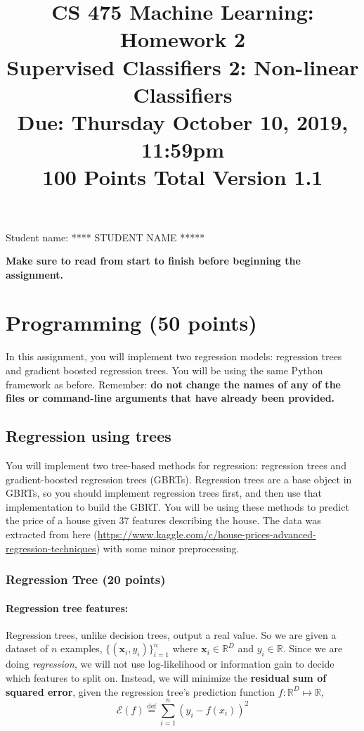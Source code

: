 \documentclass[11pt]{article}
\title{CS 475 Machine Learning: Homework 2\\
Supervised Classifiers 2: Non-linear Classifiers\\
\Large{Due: Thursday October 10, 2019, 11:59pm}\\
100 Points Total \hspace{1cm} Version 1.1}
\author{}
\date{}
\newcommand{\defeq}{\overset{\text{def}}{=}}
\begin{document}
\large
\maketitle
\thispagestyle{headings}

\vspace{-.5in}


\begin{answertext}{2cm}{}\centering
  Student name:  **** STUDENT NAME *****\\

\end{answertext}

{\bf Make sure to read from start to finish before beginning the assignment.}
\section{Programming (50 points)}
In this assignment, you will implement two regression models: regression trees and gradient boosted regression trees.
You will be using the same Python framework as before. Remember: \textbf{do not change the names of any of the files or command-line arguments that have already been provided.}

\subsection{Regression using trees}
You will implement two tree-based methods for regression: regression trees and gradient-boosted regression trees (GBRTs). Regression trees are a base object in GBRTs, so you should implement regression trees first, and then use that implementation to build the GBRT. You will be using these methods to predict the price of a house given 37 features describing the house. The data was extracted from here (\url{https://www.kaggle.com/c/house-prices-advanced-regression-techniques}) with some minor preprocessing.


\subsubsection{Regression Tree (20 points)}
\paragraph{Regression tree features:}

Regression trees, unlike decision trees, output a real value.  So we are given a
dataset of $n$ examples, $\{ (\boldsymbol{x}_i, y_i) \}^n_{i=1}$ where
$\boldsymbol{x}_i \in \mathbb{R}^D$ and $y_i \in \mathbb{R}$.  Since we are
doing \emph{regression}, we will not use log-likelihood or information gain to
decide which features to split on.  Instead, we will minimize the
\textbf{residual sum of squared error}, given the regression tree's prediction
function $f: \mathbb{R}^D \mapsto \mathbb{R}$,
\begin{equation}\label{eq:rss}
  \mathcal{E}(f) \defeq \sum_{i=1}^n (y_i - f(x_i))^2
\end{equation}
\end{document}
